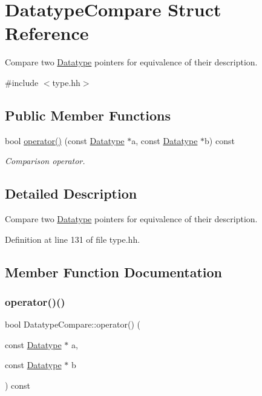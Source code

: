 \hypertarget{struct_datatype_compare}{}\section{Datatype\+Compare Struct Reference}
\label{struct_datatype_compare}


Compare two \mbox{\hyperlink{class_datatype}{Datatype}} pointers for equivalence of their description.  




{\ttfamily \#include $<$type.\+hh$>$}

\subsection*{Public Member Functions}
\begin{DoxyCompactItemize}
\item 
bool \mbox{\hyperlink{struct_datatype_compare_a1e1552890e1e0ed8b1ec6dd93feb1648}{operator()}} (const \mbox{\hyperlink{class_datatype}{Datatype}} $\ast$a, const \mbox{\hyperlink{class_datatype}{Datatype}} $\ast$b) const
\begin{DoxyCompactList}\small\item\em Comparison operator. \end{DoxyCompactList}\end{DoxyCompactItemize}


\subsection{Detailed Description}
Compare two \mbox{\hyperlink{class_datatype}{Datatype}} pointers for equivalence of their description. 

Definition at line 131 of file type.\+hh.



\subsection{Member Function Documentation}
\mbox{\label{struct_datatype_compare_a1e1552890e1e0ed8b1ec6dd93feb1648}} 
\subsubsection{\texorpdfstring{operator()()}{operator()()}}
{\footnotesize\ttfamily bool Datatype\+Compare\+::operator() (\begin{DoxyParamCaption}\item[{const \mbox{\hyperlink{class_datatype}{Datatype}} $\ast$}]{a,  }\item[{const \mbox{\hyperlink{class_datatype}{Datatype}} $\ast$}]{b }\end{DoxyParamCaption}) const\hspace{0.3cm}{\ttfamily [inline]}}




